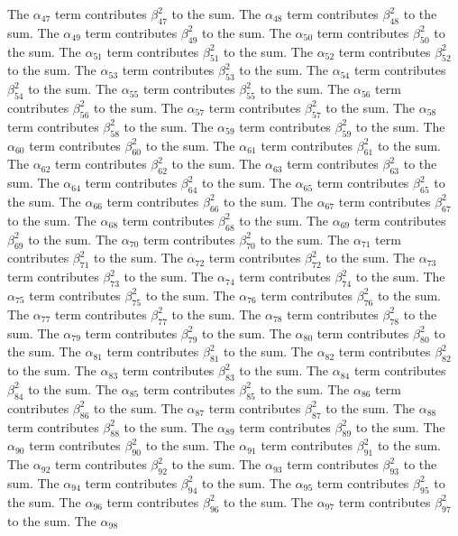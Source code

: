 \begin{lemma}
The $\alpha_{47}$ term contributes $\beta_{47}^{2}$ to the sum. The $\alpha_{48}$ term contributes $\beta_{48}^{2}$ to the sum. The $\alpha_{49}$ term contributes $\beta_{49}^{2}$ to the sum. The $\alpha_{50}$ term contributes $\beta_{50}^{2}$ to the sum. The $\alpha_{51}$ term contributes $\beta_{51}^{2}$ to the sum. The $\alpha_{52}$ term contributes $\beta_{52}^{2}$ to the sum. The $\alpha_{53}$ term contributes $\beta_{53}^{2}$ to the sum. The $\alpha_{54}$ term contributes $\beta_{54}^{2}$ to the sum. The $\alpha_{55}$ term contributes $\beta_{55}^{2}$ to the sum. The $\alpha_{56}$ term contributes $\beta_{56}^{2}$ to the sum. The $\alpha_{57}$ term contributes $\beta_{57}^{2}$ to the sum. The $\alpha_{58}$ term contributes $\beta_{58}^{2}$ to the sum. The $\alpha_{59}$ term contributes $\beta_{59}^{2}$ to the sum. The $\alpha_{60}$ term contributes $\beta_{60}^{2}$ to the sum. The $\alpha_{61}$ term contributes $\beta_{61}^{2}$ to the sum. The $\alpha_{62}$ term contributes $\beta_{62}^{2}$ to the sum. The $\alpha_{63}$ term contributes $\beta_{63}^{2}$ to the sum. The $\alpha_{64}$ term contributes $\beta_{64}^{2}$ to the sum. The $\alpha_{65}$ term contributes $\beta_{65}^{2}$ to the sum. The $\alpha_{66}$ term contributes $\beta_{66}^{2}$ to the sum. The $\alpha_{67}$ term contributes $\beta_{67}^{2}$ to the sum. The $\alpha_{68}$ term contributes $\beta_{68}^{2}$ to the sum. The $\alpha_{69}$ term contributes $\beta_{69}^{2}$ to the sum. The $\alpha_{70}$ term contributes $\beta_{70}^{2}$ to the sum. The $\alpha_{71}$ term contributes $\beta_{71}^{2}$ to the sum. The $\alpha_{72}$ term contributes $\beta_{72}^{2}$ to the sum. The $\alpha_{73}$ term contributes $\beta_{73}^{2}$ to the sum. The $\alpha_{74}$ term contributes $\beta_{74}^{2}$ to the sum. The $\alpha_{75}$ term contributes $\beta_{75}^{2}$ to the sum. The $\alpha_{76}$ term contributes $\beta_{76}^{2}$ to the sum. The $\alpha_{77}$ term contributes $\beta_{77}^{2}$ to the sum. The $\alpha_{78}$ term contributes $\beta_{78}^{2}$ to the sum. The $\alpha_{79}$ term contributes $\beta_{79}^{2}$ to the sum. The $\alpha_{80}$ term contributes $\beta_{80}^{2}$ to the sum. The $\alpha_{81}$ term contributes $\beta_{81}^{2}$ to the sum. The $\alpha_{82}$ term contributes $\beta_{82}^{2}$ to the sum. The $\alpha_{83}$ term contributes $\beta_{83}^{2}$ to the sum. The $\alpha_{84}$ term contributes $\beta_{84}^{2}$ to the sum. The $\alpha_{85}$ term contributes $\beta_{85}^{2}$ to the sum. The $\alpha_{86}$ term contributes $\beta_{86}^{2}$ to the sum. The $\alpha_{87}$ term contributes $\beta_{87}^{2}$ to the sum. The $\alpha_{88}$ term contributes $\beta_{88}^{2}$ to the sum. The $\alpha_{89}$ term contributes $\beta_{89}^{2}$ to the sum. The $\alpha_{90}$ term contributes $\beta_{90}^{2}$ to the sum. The $\alpha_{91}$ term contributes $\beta_{91}^{2}$ to the sum. The $\alpha_{92}$ term contributes $\beta_{92}^{2}$ to the sum. The $\alpha_{93}$ term contributes $\beta_{93}^{2}$ to the sum. The $\alpha_{94}$ term contributes $\beta_{94}^{2}$ to the sum. The $\alpha_{95}$ term contributes $\beta_{95}^{2}$ to the sum. The $\alpha_{96}$ term contributes $\beta_{96}^{2}$ to the sum. The $\alpha_{97}$ term contributes $\beta_{97}^{2}$ to the sum. The $\alpha_{98}$ 
\end{lemma}

